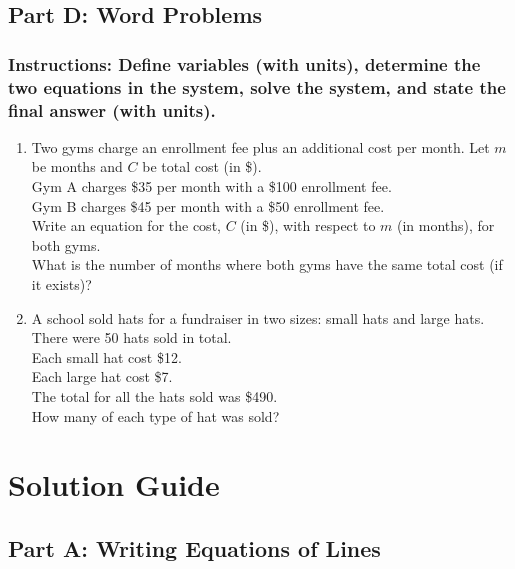 \documentclass[12pt]{article}
\begin{document}
        \subsection*{Part D: Word Problems}
        
            \subsubsection*{Instructions: Define variables (with units), determine the two equations in the system, solve the system, and state the final answer (with units).}

                \begin{enumerate}
                    \item Two gyms charge an enrollment fee plus an additional cost per month. Let $m$ be months and $C$ be total cost (in \$).\\
                    Gym A charges \$35 per month with a \$100 enrollment fee.\\
                    Gym B charges \$45 per month with a \$50 enrollment fee.\\
                    Write an equation for the cost, $C$ (in \$), with respect to $m$ (in months), for both gyms.\\
                    What is the number of months where both gyms have the same total cost (if it exists)?
                    
                    \item A school sold hats for a fundraiser in two sizes: small hats and large hats.\\
                    There were 50 hats sold in total.\\
                    Each small hat cost \$12.\\
                    Each large hat cost \$7.\\
                    The total for all the hats sold was \$490.\\
                    How many of each type of hat was sold?
                \end{enumerate}

                \newpage

    \section*{Solution Guide}

        \subsection*{Part A: Writing Equations of Lines}
\end{document}
